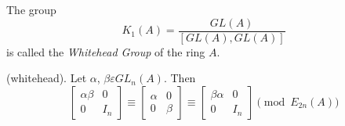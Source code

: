 \begin{dfn}\label{c1:dfn2.1}
The group
$$
K_1(A)=\dfrac{GL(A)}{[GL(A),GL(A)]}
$$
is called the \textit{Whitehead Group} of the ring $A$.
\end{dfn}

\begin{lem}\label{c1:lem2.2}
(whitehead). Let $\alpha$, $\beta \varepsilon GL_n(A)$. Then 
$$
\begin{bmatrix}
\alpha\beta & 0\\
0 & I_n
\end{bmatrix} \equiv \begin{bmatrix}
\alpha & 0\\
0 & \beta
\end{bmatrix} \equiv \begin{bmatrix}
\beta\alpha & 0\\
0 & I_n 
\end{bmatrix} \pmod{E_{2n}(A)}
$$
\end{lem}

